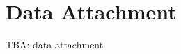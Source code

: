 \documentclass[
    digital,
    color,
    11pt,
    nocover,
    table,  %
    nolof,  %
    nolot,  %
    microtype,
]{fithesis3}
\begin{document}









\printbibliography[heading=bibintoc]

\appendix

%

\chapter{Data Attachment}
\label{chap:data}

TBA: data attachment
\end{document}
